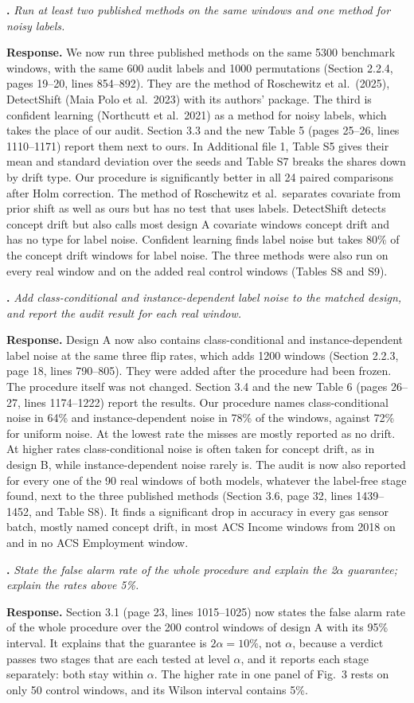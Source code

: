 \documentclass[11pt,a4paper]{article}
\newcounter{point}
\newcommand{\point}[1]{\par\medskip\stepcounter{point}\textbf{\thepoint. }\textit{#1}\par}
\newcommand{\reply}{\textbf{Response. }}
\begin{document}
\point{Run at least two published methods on the same windows and one method for noisy labels.}
\reply We now run three published methods on the same 5300 benchmark windows, with the same 600 audit labels and 1000 permutations (Section 2.2.4, pages 19--20, lines 854--892). They are the method of Roschewitz et al.\ (2025), DetectShift (Maia Polo et al.\ 2023) with its authors' package. The third is confident learning (Northcutt et al.\ 2021) as a method for noisy labels, which takes the place of our audit. Section 3.3 and the new Table 5 (pages 25--26, lines 1110--1171) report them next to ours. In Additional file 1, Table S5 gives their mean and standard deviation over the seeds and Table S7 breaks the shares down by drift type. Our procedure is significantly better in all 24 paired comparisons after Holm correction. The method of Roschewitz et al.\ separates covariate from prior shift as well as ours but has no test that uses labels. DetectShift detects concept drift but also calls most design A covariate windows concept drift and has no type for label noise. Confident learning finds label noise but takes 80\% of the concept drift windows for label noise. The three methods were also run on every real window and on the added real control windows (Tables S8 and S9).

\point{Add class-conditional and instance-dependent label noise to the matched design, and report the audit result for each real window.}
\reply Design A now also contains class-conditional and instance-dependent label noise at the same three flip rates, which adds 1200 windows (Section 2.2.3, page 18, lines 790--805). They were added after the procedure had been frozen. The procedure itself was not changed. Section 3.4 and the new Table 6 (pages 26--27, lines 1174--1222) report the results. Our procedure names class-conditional noise in 64\% and instance-dependent noise in 78\% of the windows, against 72\% for uniform noise. At the lowest rate the misses are mostly reported as no drift. At higher rates class-conditional noise is often taken for concept drift, as in design B, while instance-dependent noise rarely is. The audit is now also reported for every one of the 90 real windows of both models, whatever the label-free stage found, next to the three published methods (Section 3.6, page 32, lines 1439--1452, and Table S8). It finds a significant drop in accuracy in every gas sensor batch, mostly named concept drift, in most ACS Income windows from 2018 on and in no ACS Employment window.

\point{State the false alarm rate of the whole procedure and explain the 2$\alpha$ guarantee; explain the rates above 5\%.}
\reply Section 3.1 (page 23, lines 1015--1025) now states the false alarm rate of the whole procedure over the 200 control windows of design A with its 95\% interval. It explains that the guarantee is $2\alpha = 10\%$, not $\alpha$, because a verdict passes two stages that are each tested at level $\alpha$, and it reports each stage separately: both stay within $\alpha$. The higher rate in one panel of Fig.~3 rests on only 50 control windows, and its Wilson interval contains 5\%.
\end{document}
